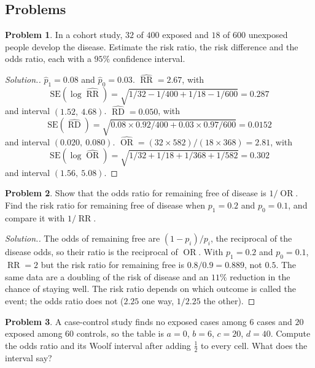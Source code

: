 \documentclass[11pt,a4paper]{article}
\numberwithin{equation}{section}
\DeclareMathOperator{\OR}{OR}
\DeclareMathOperator{\RR}{RR}
\DeclareMathOperator{\RD}{RD}
\theoremstyle{definition}
\newtheorem{problemx}{Problem}[subsection]
\newenvironment{problem}{\begin{problemx}}{\end{problemx}}
\newenvironment{solution}
  {\renewcommand{\qedsymbol}{}\begin{proof}[\textit{Solution}.]}
  {\end{proof}}
\begin{document}
\subsection{Problems}

\begin{problem}
In a cohort study, $32$ of $400$ exposed and $18$ of $600$ unexposed people develop the disease. Estimate the risk ratio, the risk
difference and the odds ratio, each with a $95\%$ confidence interval.
\end{problem}

\begin{solution}
$\hat p_1 = 0.08$ and $\hat p_0 = 0.03$.
$\widehat{\RR} = 2.67$, with
\[
\text{SE}(\log\widehat{\RR}) = \sqrt{1/32 - 1/400 + 1/18 - 1/600} = 0.287
\]
and interval $(1.52,\ 4.68)$. $\widehat{\RD} = 0.050$, with
\[
\text{SE}(\widehat{\RD}) = \sqrt{0.08 \times 0.92/400 + 0.03 \times 0.97/600} = 0.0152
\]
and interval $(0.020,\ 0.080)$. $\widehat{\OR} = (32 \times 582)/(18 \times 368) = 2.81$, with
\[
\text{SE}(\log\widehat{\OR}) = \sqrt{1/32 + 1/18 + 1/368 + 1/582} = 0.302
\]
and interval $(1.56,\ 5.08)$.
\end{solution}

\begin{problem}
\label{prob:symmetry}
Show that the odds ratio for remaining free of disease is $1/\OR$. Find the risk ratio for remaining free of disease when $p_1 = 0.2$ and
$p_0 = 0.1$, and compare it with $1/\RR$.
\end{problem}

\begin{solution}
The odds of remaining free are $(1 - p_i)/p_i$, the reciprocal of the disease odds, so their ratio is the reciprocal of $\OR$. With
$p_1 = 0.2$ and $p_0 = 0.1$, $\RR = 2$ but the risk ratio for remaining free is $0.8/0.9 = 0.889$, not $0.5$. The same data are a doubling of the
risk of disease and an $11\%$ reduction in the chance of staying well. The risk ratio depends on which outcome is called the event;
the odds ratio does not ($2.25$ one way, $1/2.25$ the other).
\end{solution}

\begin{problem}
A case-control study finds no exposed cases among $6$ cases and $20$ exposed among $60$ controls, so the table is $a = 0$, $b = 6$, $c = 20$,
$d = 40$. Compute the odds ratio and its Woolf interval after adding $\tfrac12$ to every cell. What does the interval say?
\end{problem}
\end{document}
